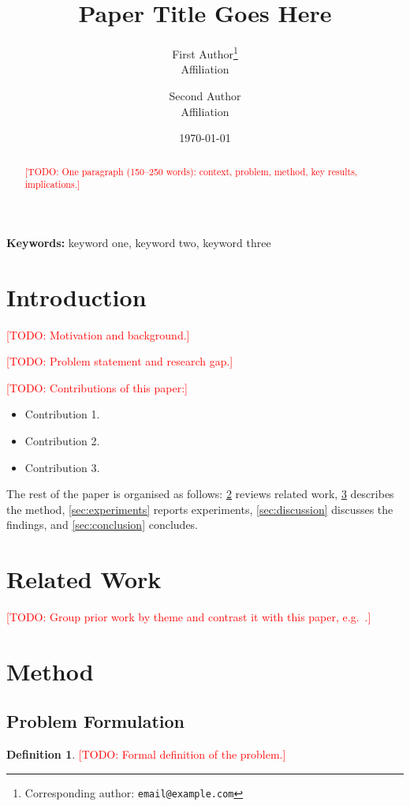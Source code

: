 \documentclass[11pt,a4paper]{article}
\title{Paper Title Goes Here}
\author{
  First Author\thanks{Corresponding author: \texttt{email@example.com}} \\
  Affiliation \\
  \and
  Second Author \\
  Affiliation
}
\date{\today}
\theoremstyle{definition}
\newtheorem{definition}{Definition}
\newcommand{\todo}[1]{\textcolor{red}{[TODO: #1]}}
\begin{document}
\maketitle

\begin{abstract}
\todo{One paragraph (150--250 words): context, problem, method, key results, implications.}
\end{abstract}

\noindent\textbf{Keywords:} keyword one, keyword two, keyword three

\section{Introduction}
\label{sec:intro}
\todo{Motivation and background.}

\todo{Problem statement and research gap.}

\todo{Contributions of this paper:}
\begin{itemize}
  \item Contribution 1.
  \item Contribution 2.
  \item Contribution 3.
\end{itemize}

The rest of the paper is organised as follows: \cref{sec:related} reviews related work,
\cref{sec:method} describes the method, \cref{sec:experiments} reports experiments,
\cref{sec:discussion} discusses the findings, and \cref{sec:conclusion} concludes.

\section{Related Work}
\label{sec:related}
\todo{Group prior work by theme and contrast it with this paper, e.g.\ \citet{example2024}.}

\section{Method}
\label{sec:method}

\subsection{Problem Formulation}
\begin{definition}
\todo{Formal definition of the problem.}
\end{definition}
\end{document}
